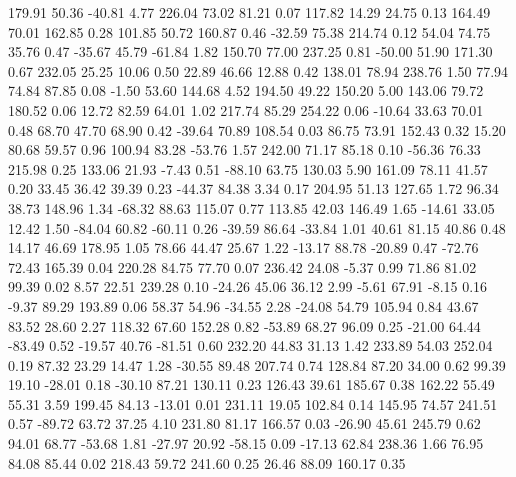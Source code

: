   179.91   50.36  -40.81    4.77
  226.04   73.02   81.21    0.07
  117.82   14.29   24.75    0.13
  164.49   70.01  162.85    0.28
  101.85   50.72  160.87    0.46
  -32.59   75.38  214.74    0.12
   54.04   74.75   35.76    0.47
  -35.67   45.79  -61.84    1.82
  150.70   77.00  237.25    0.81
  -50.00   51.90  171.30    0.67
  232.05   25.25   10.06    0.50
   22.89   46.66   12.88    0.42
  138.01   78.94  238.76    1.50
   77.94   74.84   87.85    0.08
   -1.50   53.60  144.68    4.52
  194.50   49.22  150.20    5.00
  143.06   79.72  180.52    0.06
   12.72   82.59   64.01    1.02
  217.74   85.29  254.22    0.06
  -10.64   33.63   70.01    0.48
   68.70   47.70   68.90    0.42
  -39.64   70.89  108.54    0.03
   86.75   73.91  152.43    0.32
   15.20   80.68   59.57    0.96
  100.94   83.28  -53.76    1.57
  242.00   71.17   85.18    0.10
  -56.36   76.33  215.98    0.25
  133.06   21.93   -7.43    0.51
  -88.10   63.75  130.03    5.90
  161.09   78.11   41.57    0.20
   33.45   36.42   39.39    0.23
  -44.37   84.38    3.34    0.17
  204.95   51.13  127.65    1.72
   96.34   38.73  148.96    1.34
  -68.32   88.63  115.07    0.77
  113.85   42.03  146.49    1.65
  -14.61   33.05   12.42    1.50
  -84.04   60.82  -60.11    0.26
  -39.59   86.64  -33.84    1.01
   40.61   81.15   40.86    0.48
   14.17   46.69  178.95    1.05
   78.66   44.47   25.67    1.22
  -13.17   88.78  -20.89    0.47
  -72.76   72.43  165.39    0.04
  220.28   84.75   77.70    0.07
  236.42   24.08   -5.37    0.99
   71.86   81.02   99.39    0.02
    8.57   22.51  239.28    0.10
  -24.26   45.06   36.12    2.99
   -5.61   67.91   -8.15    0.16
   -9.37   89.29  193.89    0.06
   58.37   54.96  -34.55    2.28
  -24.08   54.79  105.94    0.84
   43.67   83.52   28.60    2.27
  118.32   67.60  152.28    0.82
  -53.89   68.27   96.09    0.25
  -21.00   64.44  -83.49    0.52
  -19.57   40.76  -81.51    0.60
  232.20   44.83   31.13    1.42
  233.89   54.03  252.04    0.19
   87.32   23.29   14.47    1.28
  -30.55   89.48  207.74    0.74
  128.84   87.20   34.00    0.62
   99.39   19.10  -28.01    0.18
  -30.10   87.21  130.11    0.23
  126.43   39.61  185.67    0.38
  162.22   55.49   55.31    3.59
  199.45   84.13  -13.01    0.01
  231.11   19.05  102.84    0.14
  145.95   74.57  241.51    0.57
  -89.72   63.72   37.25    4.10
  231.80   81.17  166.57    0.03
  -26.90   45.61  245.79    0.62
   94.01   68.77  -53.68    1.81
  -27.97   20.92  -58.15    0.09
  -17.13   62.84  238.36    1.66
   76.95   84.08   85.44    0.02
  218.43   59.72  241.60    0.25
   26.46   88.09  160.17    0.35
